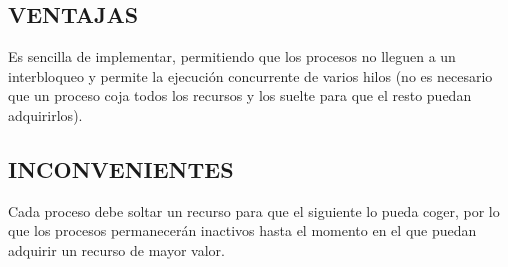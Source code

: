 \documentclass[10 pt,spanish]{article}  %
\begin{document}
\subsection{VENTAJAS}
Es sencilla de implementar, permitiendo que los procesos no lleguen a un interbloqueo y permite la ejecución concurrente de varios hilos (no es necesario que un proceso coja todos los recursos y los suelte para que el resto puedan adquirirlos). 
\subsection{INCONVENIENTES}
Cada proceso debe soltar un recurso para que el siguiente lo pueda coger, por lo que los procesos permanecerán inactivos hasta el momento en el que puedan adquirir un recurso de mayor valor.  
\end{document}
